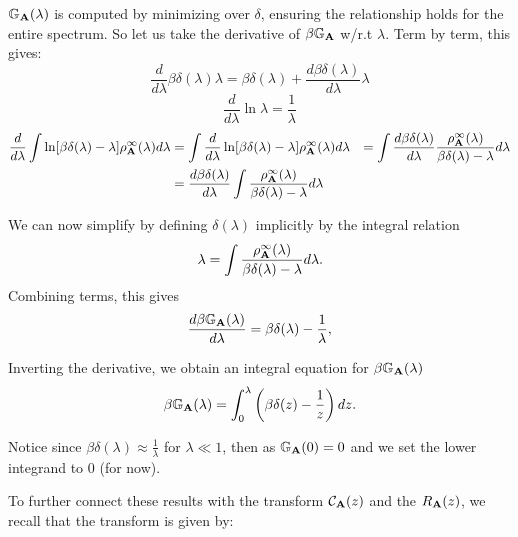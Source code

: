 $\mathbb{G}_{\mathbf{A}}(\lambda)$ is computed by minimizing over $\delta$, ensuring the relationship holds for the entire spectrum.
So let us take the derivative of $\beta\mathbb{G}_{\mathbf{A}}$ w/r.t $\lambda$. 
Term by term, this gives:
\begin{equation}
\dfrac{d}{d\lambda} \beta\delta(\lambda)\lambda = \beta\delta(\lambda) + \dfrac{d \beta\delta(\lambda)}{d\lambda} \lambda
\end{equation}
\begin{equation}
\dfrac{d}{d\lambda} \ln\lambda = \dfrac{1}{\lambda}
\end{equation}
\begin{align}
\dfrac{d}{d\lambda} \int \ln[\beta\delta(\lambda) - \lambda] \rho^{\infty}_{\mathbf{A}}(\lambda) d\lambda
&= \int \dfrac{d}{d\lambda} \ln[\beta\delta(\lambda) - \lambda] \rho^{\infty}_{\mathbf{A}}(\lambda) d\lambda
&= \int \dfrac{d \beta\delta(\lambda)}{d\lambda}\dfrac{ \rho^{\infty}_{\mathbf{A}}(\lambda)}{\beta\delta(\lambda) - \lambda}d\lambda  \\ \nonumber
&=  \dfrac{d \beta\delta(\lambda)}{d\lambda}\int\dfrac{ \rho^{\infty}_{\mathbf{A}}(\lambda)}{\beta\delta(\lambda) - \lambda}d\lambda
\end{align}

We can now simplify by  defining $\delta(\lambda)$ implicitly by the integral relation
\begin{equation}
\lambda = \int \frac{\rho^{\infty}_{\mathbf{A}}(\lambda)}{\beta\delta(\lambda) - \lambda} d\lambda.
\end{equation}
Combining terms, this gives
\begin{equation}
\frac{d\beta\mathbb{G}_{\mathbf{A}}(\lambda)}{d\lambda} = \beta\delta(\lambda) - \frac{1}{\lambda},
\end{equation}

 Inverting the derivative, we obtain an integral equation for $\beta\mathbb{G}_{\mathbf{A}}(\lambda)$ 
\begin{equation}
\beta\mathbb{G}_{\mathbf{A}}(\lambda) = \int_0^\lambda \left(\beta\delta(z) - \frac{1}{z}\right) dz.
\end{equation}

Notice since  $\beta\delta(\lambda) \approx \frac{1}{\lambda}$ for $\lambda \ll 1$, then
as $\mathbb{G}_{\mathbf{A}}(0) = 0$ and we set the lower integrand to $0$ (for now).


To further connect these results with the \Cauchy transform $\mathcal{C}_{\mathbf{A}}(z)$ and the \RTransform $R_{\mathbf{A}}(z)$, we recall that the \Cauchy transform is given by:

